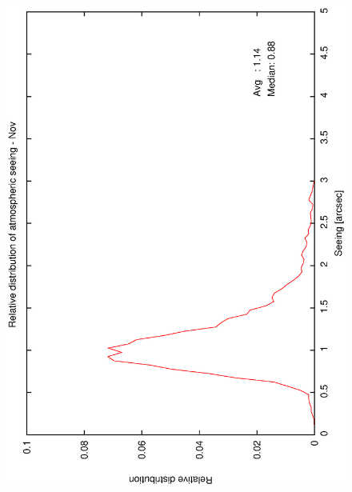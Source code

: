 {{\begin{figure}[htbp]
\begin{center}
{   \includegraphics[scale=0.25, angle=-90]{figures/ecs/corr_see_dist_nov.eps}  
   \label{fig:see_dist_nov}
  }
 \subfigure[] {
}
\end{center}
\end{figure}}}
